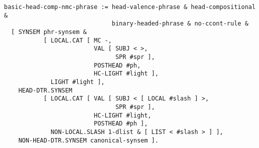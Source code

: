 \documentclass[a4paper]{article}
\begin{document}
{\small\begin{verbatim}
basic-head-comp-nmc-phrase := head-valence-phrase & head-compositional & 
                              binary-headed-phrase & no-ccont-rule & 
  [ SYNSEM phr-synsem &
           [ LOCAL.CAT [ MC -,
                         VAL [ SUBJ < >,
                               SPR #spr ],
                         POSTHEAD #ph,
                         HC-LIGHT #light ],
             LIGHT #light ],
    HEAD-DTR.SYNSEM 
           [ LOCAL.CAT [ VAL [ SUBJ < [ LOCAL #slash ] >,
                               SPR #spr ],
                         HC-LIGHT #light,
                         POSTHEAD #ph ],
             NON-LOCAL.SLASH 1-dlist & [ LIST < #slash > ] ], 
    NON-HEAD-DTR.SYNSEM canonical-synsem ].
\end{verbatim}}
\end{document}
